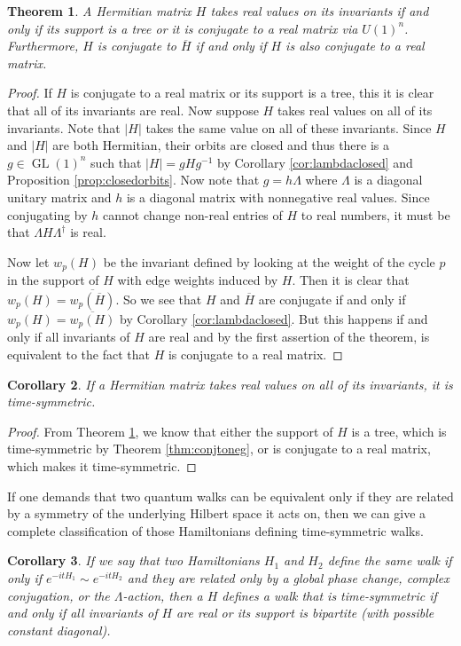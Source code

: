 \documentclass[twocolumn,superscriptaddress]{revtex4-1}
\newcommand{\GL}{\operatorname{GL}}
\theoremstyle{plain}
\newtheorem{theorem}{Theorem}[section]
\newtheorem{corollary}[theorem]{Corollary}
\theoremstyle{definition}
\theoremstyle{definition}
\theoremstyle{definition}
\theoremstyle{definition}
\theoremstyle{definition}
\theoremstyle{definition}
\begin{document}
\begin{theorem}\label{thm:realinvs}
 A Hermitian matrix $H$ takes real values on its invariants if and only if its support is a tree or it is conjugate to a real matrix via $U(1)^n$. Furthermore, $H$ is conjugate to $\overline{H}$ if and only if $H$ is also conjugate to a real matrix.
\end{theorem}
\begin{proof}
 If $H$ is conjugate to a real matrix or its support is a tree, this it is clear that all of its invariants are real. Now suppose $H$ takes real values on all of its invariants. Note that $|H|$ takes the same value on all of these invariants. Since $H$ and $|H|$ are both Hermitian, their orbits are closed and thus there is a $g\in \GL(1)^n$ such that $|H|=gHg^{-1}$ by Corollary \ref{cor:lambdaclosed} and Proposition \ref{prop:closedorbits}. Now note that $g=h\Lambda$ where $\Lambda$ is a diagonal unitary matrix and $h$ is a diagonal matrix with nonnegative real values. Since conjugating by $h$ cannot change non-real entries of $H$ to real numbers, it must be that $\Lambda H\Lambda^\dagger$ is real.
 
Now let $w_p(H)$ be the invariant defined by looking at the weight of the cycle $p$ in the support of $H$ with edge weights induced by $H$. Then it is clear that $w_p(H)=\overline{w_p(\overline{H})}$. So we see that $H$ and $\overline{H}$ are conjugate if and only if $w_p(H)=\overline{w_p(H)}$ by Corollary \ref{cor:lambdaclosed}. But this happens if and only if all invariants of $H$ are real and by the first assertion of the theorem, is equivalent to the fact that $H$ is conjugate to a real matrix.
\end{proof}
\begin{corollary}\label{cor:realinvs}
 If a Hermitian matrix takes real values on all of its invariants, it is time-symmetric.
\end{corollary}
\begin{proof}
 From Theorem \ref{thm:realinvs}, we know that either the support of $H$ is a tree, which is time-symmetric by Theorem \ref{thm:conjtoneg}, or is conjugate to a real matrix, which makes it time-symmetric.
\end{proof}

If one demands that two quantum walks can be equivalent only if they are related by a symmetry of the underlying Hilbert space it acts on, then we can give a complete classification of those Hamiltonians defining time-symmetric walks.

\begin{corollary}
 If we say that two Hamiltonians $H_1$ and $H_2$ define the same walk if only if $e^{-it H_1}\sim e^{-it H_2}$ and they are related only by a global phase change, complex conjugation, or the $\Lambda$-action, then a $H$ defines a walk that is time-symmetric if and only if all invariants of $H$ are real or its support is bipartite (with possible constant diagonal).
\end{corollary}
\end{document}
